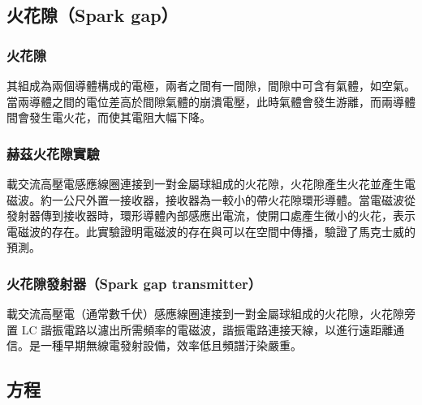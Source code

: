 \documentclass[a4paper,12pt]{report}
\begin{document}
\begin{itemize}
\subsection{火花隙（Spark gap）}
\subsubsection{火花隙}
其組成為兩個導體構成的電極，兩者之間有一間隙，間隙中可含有氣體，如空氣。當兩導體之間的電位差高於間隙氣體的崩潰電壓，此時氣體會發生游離，而兩導體間會發生電火花，而使其電阻大幅下降。
\subsubsection{赫茲火花隙實驗}
載交流高壓電感應線圈連接到一對金屬球組成的火花隙，火花隙產生火花並產生電磁波。約一公尺外置一接收器，接收器為一較小的帶火花隙環形導體。當電磁波從發射器傳到接收器時，環形導體內部感應出電流，使開口處產生微小的火花，表示電磁波的存在。此實驗證明電磁波的存在與可以在空間中傳播，驗證了馬克士威的預測。
\subsubsection{火花隙發射器（Spark gap transmitter）}
載交流高壓電（通常數千伏）感應線圈連接到一對金屬球組成的火花隙，火花隙旁置 LC 諧振電路以濾出所需頻率的電磁波，諧振電路連接天線，以進行遠距離通信。是一種早期無線電發射設備，效率低且頻譜汙染嚴重。
\subsection{方程}

\end{itemize}
\end{document}
